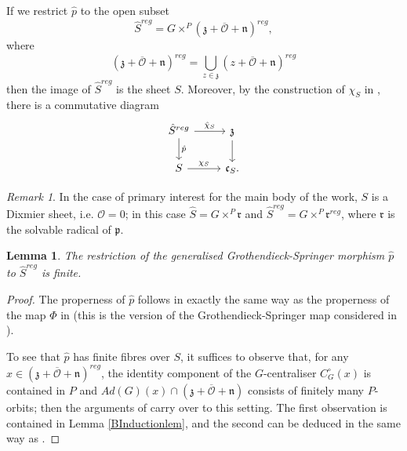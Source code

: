 \documentclass{amsart}
\newtheorem{lemma}[theorem]{Lemma}
\theoremstyle{remark}
\newtheorem{remark}[theorem]{Remark}
\numberwithin{theorem}{section}
\numberwithin{equation}{section}
\begin{document}
If we restrict $\hat{p}$ to the open subset 
\begin{equation}\label{GeneralisedGSRegeqn}
    \hat{S}^{reg} = G \times^P (\mathfrak{z} + \overline{\mathcal O}+\mathfrak{n})^{reg},
\end{equation}
where
\begin{equation}
    (\mathfrak{z} +\overline{\mathcal O} +\mathfrak{n})^{reg} = \bigcup_{z \in \mathfrak{z}}(z +\overline{\mathcal O} +\mathfrak{n})^{reg}
\end{equation}
then the image of $\hat{S}^{reg}$ is the sheet $S$. Moreover, by the construction of $\chi_S$ in \cite[5.1]{Borho2}, there is a commutative diagram
\begin{equation}\label{GSDiagrameqn}
        \begin{tikzcd}
         \hat{S}^{reg} \arrow[r, "\hat{\chi}_S"] \arrow[d, "\hat{p}"] & \mathfrak{z} \arrow[d] \\
            S \arrow[r, "\chi_S"]                                       & \mathfrak{c}_S.              
        \end{tikzcd}
    \end{equation}
\begin{remark}\label{DixmierGSrmk}
    In the case of primary interest for the main body of the work, $S$ is a Dixmier sheet, i.e. $\mathcal O = 0$; in this case $\hat{S} = G \times^P\mathfrak{r}$ and $\hat{S}^{reg} = G \times^P \mathfrak{r}^{reg}$, where $\mathfrak{r}$ is the solvable radical of $\mathfrak{p}$. 
\end{remark}

\begin{lemma}\label{GSDiagramlem}
    The restriction of the generalised Grothendieck-Springer morphism $\hat{p}$ to $\hat{S}^{reg}$ is finite.
\end{lemma}

\begin{proof}
The properness of $\hat{p}$ follows in exactly the same way as the properness of the map $\Phi$ in \cite[7.9]{BK} (this is the version of the Grothendieck-Springer map considered in \cite{Broer1}). 

To see that $\hat{p}$ has finite fibres over $S$, it suffices to observe that, for any $x \in (\mathfrak{z}+\overline{\mathcal O}+\mathfrak{n})^{reg}$, the identity component of the $G$-centraliser $C_G^\circ(x)$ is contained in $P$ and $Ad(G)(x) \cap (\mathfrak{z}+\overline{\mathcal O} +\mathfrak{n})$ consists of finitely many $P$-orbits; then the arguments of \cite[Lemmata 7.8 \& 7.10]{BK} carry over to this setting. The first observation is contained in Lemma \ref{BInductionlem}, and the second can be deduced in the same way as \cite[Zusatz 5.5 (f)]{BK}.
\end{proof}
\end{document}
